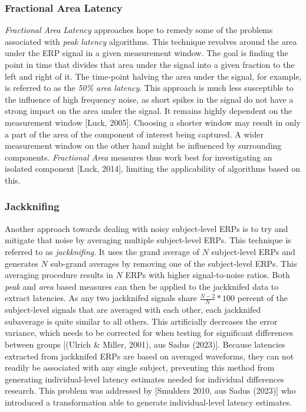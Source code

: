 \documentclass[
  man,floatsintext]{apa7}
\begin{document}
\hypertarget{fractional-area-latency}{%
\subsubsection{Fractional Area Latency}\label{fractional-area-latency}}

\emph{Fractional Area Latency} approaches hope to remedy some of the problems associated with \emph{peak latency} algorithms. This technique revolves around the area under the ERP signal in a given measurement window. The goal is finding the point in time that divides that area under the signal into a given fraction to the left and right of it. The time-point halving the area under the signal, for example, is referred to as the \emph{50\% area latency}. This approach is much less susceptible to the influence of high frequency noise, as short spikes in the signal do not have a strong impact on the area under the signal. It remains highly dependent on the measurement window {[}Luck, 2005{]}. Choosing a shorter window may result in only a part of the area of the component of interest being captured. A wider measurement window on the other hand might be influenced by surrounding components. \emph{Fractional Area} measures thus work best for investigating an isolated component {[}Luck, 2014{]}, limiting the applicability of algorithms based on this.

\hypertarget{jackknifing}{%
\subsubsection{Jackknifing}\label{jackknifing}}

Another approach towards dealing with noisy subject-level ERPs is to try and mitigate that noise by averaging multiple subject-level ERPs. This technique is referred to as \emph{jackknifing}. It uses the grand average of \(N\) subject-level ERPs and generates \(N\) sub-grand averages by removing one of the subject-level ERPs. This averaging procedure results in \(N\) ERPs with higher signal-to-noise ratios. Both \emph{peak} and \emph{area} based measures can then be applied to the jackknifed data to extract latencies. As any two jackknifed signals share \(\frac{N-2}{N} * 100\) percent of the subject-level signals that are averaged with each other, each jackknifed subaverage is quite similar to all others. This artificially decreases the error variance, which needs to be corrected for when testing for significant differences between groups {[}(Ulrich \& Miller, 2001), aus Sadus (2023){]}. Because latencies extracted from jackknifed ERPs are based on averaged waveforms, they can not readily be associated with any single subject, preventing this method from generating individual-level latency estimates needed for individual differences research. This problem was addressed by {[}Smulders 2010, aus Sadus (2023){]} who introduced a transformation able to generate individual-level latency estimates.
\end{document}
